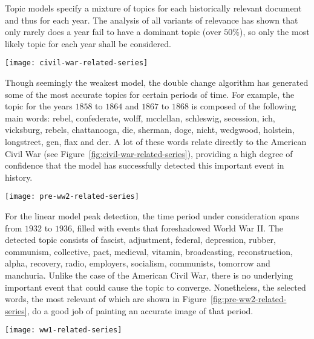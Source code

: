 
Topic models specify a mixture of topics for each historically relevant document and thus for each year. The analysis of all variants of relevance has shown that only rarely does a year fail to have a dominant topic (over $50 \%$), so only the most likely topic for each year shall be considered.

\begin{figure*}[ht]
\centering
\texttt{[image: civil-war-related-series]}
\caption{Ngram time series related to the American Civil War}
\label{fig:civil-war-related-series}
\end{figure*}

Though seemingly the weakest model, the double change algorithm has generated some of the most accurate topics for certain periods of time. For example, the topic for the years $1858$ to $1864$ and $1867$ to $1868$ is composed of the following main words: rebel, confederate, wolff, mcclellan, schleswig, secession, ich, vicksburg, rebels, chattanooga, die, sherman, doge, nicht, wedgwood, holstein, longstreet, gen, flax and der. A lot of these words relate directly to the American Civil War (see Figure~\ref{fig:civil-war-related-series}), providing a high degree of confidence that the model has successfully detected this important event in history.

\begin{figure*}[ht]
\centering
\texttt{[image: pre-ww2-related-series]}
\caption{Ngram time series related to the pre World War II period}
\label{fig:pre-ww2-related-series}
\end{figure*}

For the linear model peak detection, the time period under consideration spans from $1932$ to $1936$, filled with events that foreshadowed World War II. The detected topic consists of fascist, adjustment, federal, depression, rubber, communism, collective, pact, medieval, vitamin, broadcasting, reconstruction, alpha, recovery, radio, employers, socialism, communists, tomorrow and manchuria. Unlike the case of the American Civil War, there is no underlying important event that could cause the topic to converge. Nonetheless, the selected words, the most relevant of which are shown in Figure~\ref{fig:pre-ww2-related-series}, do a good job of painting an accurate image of that period.

\begin{figure*}[ht]
\centering
\texttt{[image: ww1-related-series]}
\caption{Ngram time series related to World War I}
\label{fig:ww1-related-series}
\end{figure*}


